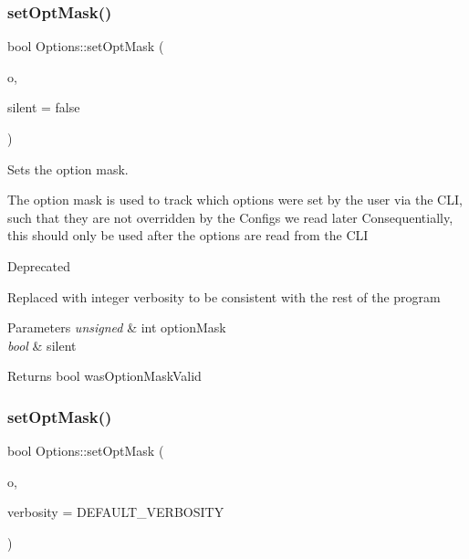 \subsubsection{\texorpdfstring{setOptMask()}{setOptMask()}\hspace{0.1cm}{\footnotesize\ttfamily [1/2]}}
{\footnotesize\ttfamily bool Options\+::set\+Opt\+Mask (\begin{DoxyParamCaption}\item[{unsigned int}]{o,  }\item[{bool}]{silent = {\ttfamily false} }\end{DoxyParamCaption})}



Sets the option mask. 

The option mask is used to track which options were set by the user via the C\+LI, such that they are not overridden by the Configs we read later Consequentially, this should only be used after the options are read from the C\+LI

\begin{DoxyRefDesc}{Deprecated}
\item[\mbox{\hyperlink{deprecated__deprecated000005}{Deprecated}}]Replaced with integer verbosity to be consistent with the rest of the program\end{DoxyRefDesc}



\begin{DoxyParams}{Parameters}
{\em unsigned} & int option\+Mask \\
\hline
{\em bool} & silent\\
\hline
\end{DoxyParams}
\begin{DoxyReturn}{Returns}
bool was\+Option\+Mask\+Valid 
\end{DoxyReturn}
\mbox{\label{classOptions_a4f11361434eef369762bbe19c282f29b}} 
\subsubsection{\texorpdfstring{setOptMask()}{setOptMask()}\hspace{0.1cm}{\footnotesize\ttfamily [2/2]}}
{\footnotesize\ttfamily bool Options\+::set\+Opt\+Mask (\begin{DoxyParamCaption}\item[{unsigned int}]{o,  }\item[{unsigned int}]{verbosity = {\ttfamily DEFAULT\+\_\+VERBOSITY} }\end{DoxyParamCaption})}




